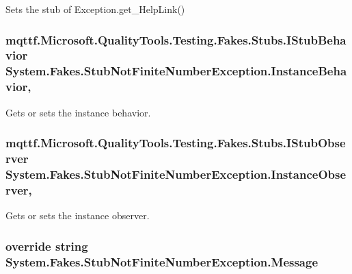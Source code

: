 Sets the stub of Exception.\-get\-\_\-\-Help\-Link()

\hypertarget{class_system_1_1_fakes_1_1_stub_not_finite_number_exception_adb274cfeade6097b952dc0465c4a65c4}{
\subsubsection[{Instance\-Behavior}]{\setlength{\rightskip}{0pt plus 5cm}mqttf.\-Microsoft.\-Quality\-Tools.\-Testing.\-Fakes.\-Stubs.\-I\-Stub\-Behavior System.\-Fakes.\-Stub\-Not\-Finite\-Number\-Exception.\-Instance\-Behavior\hspace{0.3cm}{\ttfamily [get]}, {\ttfamily [set]}}}\label{class_system_1_1_fakes_1_1_stub_not_finite_number_exception_adb274cfeade6097b952dc0465c4a65c4}


Gets or sets the instance behavior.

\hypertarget{class_system_1_1_fakes_1_1_stub_not_finite_number_exception_a10eaaa27ababd360a84ea420dfb82308}{
\subsubsection[{Instance\-Observer}]{\setlength{\rightskip}{0pt plus 5cm}mqttf.\-Microsoft.\-Quality\-Tools.\-Testing.\-Fakes.\-Stubs.\-I\-Stub\-Observer System.\-Fakes.\-Stub\-Not\-Finite\-Number\-Exception.\-Instance\-Observer\hspace{0.3cm}{\ttfamily [get]}, {\ttfamily [set]}}}\label{class_system_1_1_fakes_1_1_stub_not_finite_number_exception_a10eaaa27ababd360a84ea420dfb82308}


Gets or sets the instance observer.

\hypertarget{class_system_1_1_fakes_1_1_stub_not_finite_number_exception_a7289269a0136d0b6d9f5cc12818d2e35}{
\subsubsection[{Message}]{\setlength{\rightskip}{0pt plus 5cm}override string System.\-Fakes.\-Stub\-Not\-Finite\-Number\-Exception.\-Message\hspace{0.3cm}{\ttfamily [get]}}}\label{class_system_1_1_fakes_1_1_stub_not_finite_number_exception_a7289269a0136d0b6d9f5cc12818d2e35}


